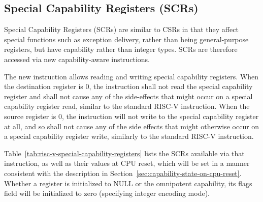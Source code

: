 \subsection{Special Capability Registers (SCRs)}
\label{subsection:cheri-riscv-scrs}

Special Capability Registers (SCRs) are similar to CSRs in that they affect
special functions such as exception delivery, rather than being
general-purpose registers, but have capability rather than integer types.
SCRs are therefore accessed via new capability-aware instructions.

The new  instruction allows reading and writing special
capability registers. When the destination register is 0, the instruction shall
not read the special capability register and shall not cause any of the
side-effects that might occur on a special capability register read, similar to
the standard  RISC-V instruction. When the source register is 0, the
instruction will not write to the special capability register at all, and so
shall not cause any of the side effects that might otherwise occur on a special
capability register write, similarly to the standard  RISC-V
instruction.

Table~\ref{tab:risc-v-special-capability-registers} lists the SCRs
available via that instruction, as well as their values at CPU reset, which
will be set in a manner consistent with the description in
Section~\ref{sec:capability-state-on-cpu-reset}.
Whether a register is initialized to NULL or the omnipotent capability, its
flags field will be initialized to zero (specifying integer encoding mode).


